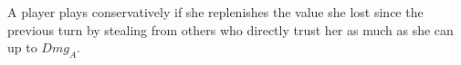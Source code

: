 {}
\begin{definition}
  A player plays conservatively if she replenishes the value she lost since the previous turn by stealing from others who
  directly trust her as much as she can up to $Dmg_A$.
\end{definition}
